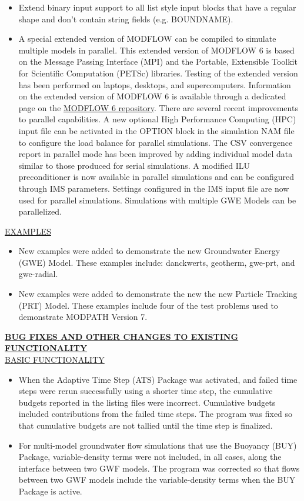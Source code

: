 \begin{itemize}
		\item Extend binary input support to all list style input blocks that have a regular shape and don't contain string fields (e.g. BOUNDNAME).
		\item A special extended version of MODFLOW can be compiled to simulate multiple models in parallel.  This extended version of MODFLOW 6 is based on the Message Passing Interface (MPI) and the Portable, Extensible Toolkit for Scientific Computation (PETSc) libraries.  Testing of the extended version has been performed on laptops, desktops, and supercomputers.  Information on the extended version of MODFLOW 6 is available through a dedicated page on the \href{https://github.com/MODFLOW-USGS/modflow6/wiki/Parallel-MODFLOW-User-Guide}{MODFLOW 6 repository}.  There are several recent improvements to parallel capabilities.  A new optional High Performance Computing (HPC) input file can be activated in the OPTION block in the simulation NAM file to configure the load balance for parallel simulations. The CSV convergence report in parallel mode has been improved by adding individual model data similar to those produced for serial simulations.  A modified ILU preconditioner is now available in parallel simulations and can be configured through IMS parameters.  Settings configured in the IMS input file are now used for parallel simulations.  Simulations with multiple GWE Models can be parallelized.
	\end{itemize}

	\underline{EXAMPLES}
	\begin{itemize}
		\item New examples were added to demonstrate the new Groundwater Energy (GWE) Model.  These examples include: danckwerts, geotherm, gwe-prt, and gwe-radial.
		\item New examples were added to demonstrate the new the new Particle Tracking (PRT) Model.  These examples include four of the test problems used to demonstrate MODPATH Version 7.
	\end{itemize}

	\textbf{\underline{BUG FIXES AND OTHER CHANGES TO EXISTING FUNCTIONALITY}} \\
	\underline{BASIC FUNCTIONALITY}
	\begin{itemize}
		\item When the Adaptive Time Step (ATS) Package was activated, and failed time steps were rerun successfully using a shorter time step, the cumulative budgets reported in the listing files were incorrect.  Cumulative budgets included contributions from the failed time steps.  The program was fixed so that cumulative budgets are not tallied until the time step is finalized.
		\item For multi-model groundwater flow simulations that use the Buoyancy (BUY) Package, variable-density terms were not included, in all cases, along the interface between two GWF models.  The program was corrected so that flows between two GWF models include the variable-density terms when the BUY Package is active.
	\end{itemize}


